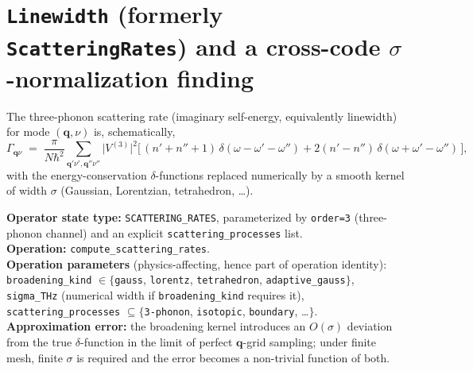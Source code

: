 \documentclass[11pt,a4paper]{article}
\begin{document}
\section{\texttt{Linewidth} (formerly \texttt{ScatteringRates}) and a cross-code $\sigma$-normalization finding}

\begin{abstractbox}
The three-phonon scattering rate (imaginary self-energy, equivalently linewidth) for
mode $(\mathbf{q}, \nu)$ is, schematically,
\begin{equation}
  \Gamma_{\mathbf{q}\nu}
  \;=\; \frac{\pi}{N\hbar^2}
        \sum_{\mathbf{q}'\nu',\mathbf{q}''\nu''} \big|V^{(3)}\big|^2
        \big[\,(n'+n''+1)\,\delta(\omega - \omega' - \omega'')
              + 2(n' - n'')\,\delta(\omega + \omega' - \omega'')\,\big],
\end{equation}
with the energy-conservation $\delta$-functions replaced numerically by a smooth kernel
of width $\sigma$ (Gaussian, Lorentzian, tetrahedron, \ldots).

\medskip
\textbf{Operator state type:} \texttt{SCATTERING\_RATES}, parameterized by \texttt{order=3}
(three-phonon channel) and an explicit \texttt{scattering\_processes} list.\\
\textbf{Operation:} \texttt{compute\_scattering\_rates}.\\
\textbf{Operation parameters} (physics-affecting, hence part of operation identity):\\
\quad \texttt{broadening\_kind} $\in\{$\texttt{gauss}, \texttt{lorentz}, \texttt{tetrahedron},
\texttt{adaptive\_gauss}$\}$,\\
\quad \texttt{sigma\_THz} (numerical width if \texttt{broadening\_kind} requires it),\\
\quad \texttt{scattering\_processes} $\subseteq \{$\texttt{3-phonon}, \texttt{isotopic},
\texttt{boundary}, \ldots$\}$.\\
\textbf{Approximation error:} the broadening kernel introduces an $O(\sigma)$ deviation
from the true $\delta$-function in the limit of perfect $\mathbf{q}$-grid sampling; under
finite mesh, finite $\sigma$ is required and the error becomes a non-trivial function of
both.
\end{abstractbox}
\end{document}
